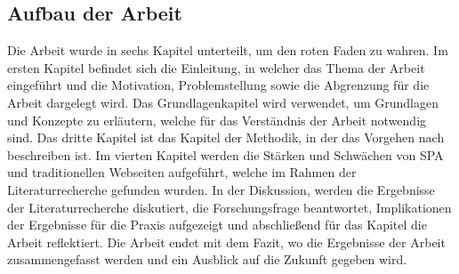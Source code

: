 \subsection{Aufbau der Arbeit}

Die Arbeit wurde in sechs Kapitel unterteilt, um den roten Faden zu wahren.
Im ersten Kapitel befindet sich die Einleitung, in welcher das Thema der Arbeit eingeführt und die Motivation, Problemstellung sowie die Abgrenzung für die Arbeit dargelegt wird.
Das Grundlagenkapitel wird verwendet, um Grundlagen und Konzepte zu erläutern, welche für das Verständnis der Arbeit notwendig sind.
Das dritte Kapitel ist das Kapitel der Methodik, in der das Vorgehen nach  beschreiben ist.
Im vierten Kapitel werden die Stärken und Schwächen von \ac{SPA} und traditionellen Webseiten aufgeführt, welche im Rahmen der Literaturrecherche gefunden wurden.
In der Diskussion, werden die Ergebnisse der Literaturrecherche diskutiert, die Forschungsfrage beantwortet, Implikationen der Ergebnisse für die Praxis aufgezeigt und abschließend für das Kapitel die Arbeit reflektiert.
Die Arbeit endet mit dem Fazit, wo die Ergebnisse der Arbeit zusammengefasst werden und ein Ausblick auf die Zukunft gegeben wird.
